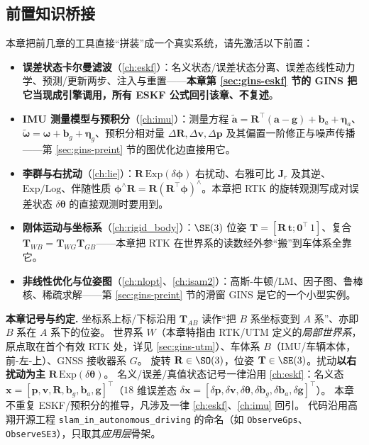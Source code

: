 \subsection*{前置知识桥接}
本章把前几章的工具直接“拼装”成一个真实系统，请先激活以下前置：
\begin{itemize}
  \item \textbf{误差状态卡尔曼滤波}（\cref{ch:eskf}）：名义状态/误差状态分离、误差态线性动力学、预测/更新两步、注入与重置——\textbf{本章第 \ref{sec:gins-eskf} 节的 GINS 把它当现成引擎调用，所有 ESKF 公式回引该章、不复述}。
  \item \textbf{IMU 测量模型与预积分}（\cref{ch:imu}）：测量方程 $\tilde{\mathbf{a}}=\mathbf{R}^\top(\mathbf{a}-\mathbf{g})+\mathbf{b}_a+\boldsymbol{\eta}_a$、$\tilde{\boldsymbol{\omega}}=\boldsymbol{\omega}+\mathbf{b}_g+\boldsymbol{\eta}_g$、预积分相对量 $\Delta\mathbf{R},\Delta\mathbf{v},\Delta\mathbf{p}$ 及其偏置一阶修正与噪声传播——第 \ref{sec:gins-preint} 节的图优化边直接用它。
  \item \textbf{李群与右扰动}（\cref{ch:lie}）：$\mathbf{R}\,\mathrm{Exp}(\delta\boldsymbol{\phi})$ 右扰动、右雅可比 $\mathbf{J}_r$ 及其逆、$\mathrm{Exp}/\mathrm{Log}$、伴随性质 $\boldsymbol{\phi}^\wedge\mathbf{R}=\mathbf{R}(\mathbf{R}^\top\boldsymbol{\phi})^\wedge$。本章把 RTK 的旋转观测写成对误差状态 $\delta\boldsymbol{\theta}$ 的直接观测时要用到。
  \item \textbf{刚体运动与坐标系}（\cref{ch:rigid_body}）：$\SE(3)$ 位姿 $\mathbf{T}=[\mathbf{R}\,\mathbf{t};\mathbf{0}^\top\,1]$、复合 $\mathbf{T}_{WB}=\mathbf{T}_{WG}\mathbf{T}_{GB}$——本章把 RTK 在世界系的读数经外参“搬”到车体系全靠它。
  \item \textbf{非线性优化与位姿图}（\cref{ch:nlopt}、\cref{ch:isam2}）：高斯-牛顿/LM、因子图、鲁棒核、稀疏求解——第 \ref{sec:gins-preint} 节的滑窗 GINS 是它的一个小型实例。
\end{itemize}

\begin{note}
\textbf{本章记号与约定.}\;
坐标系上标/下标沿用 $\mathbf{T}_{AB}$ 读作“把 $B$ 系坐标变到 $A$ 系”、亦即 $B$ 系在 $A$ 系下的位姿。
世界系 $W$（本章特指由 RTK/UTM 定义的\emph{局部世界系}，原点取在首个有效 RTK 处，详见 \cref{sec:gins-utm}）、车体系 $B$（IMU/车辆本体，前-左-上）、GNSS 接收器系 $G$。
旋转 $\mathbf{R}\in\SO(3)$，位姿 $\mathbf{T}\in\SE(3)$。扰动\textbf{以右扰动为主} $\mathbf{R}\,\mathrm{Exp}(\delta\boldsymbol{\theta})$。
名义/误差/真值状态记号一律沿用 \cref{ch:eskf}：名义态 $\mathbf{x}=[\mathbf{p},\mathbf{v},\mathbf{R},\mathbf{b}_g,\mathbf{b}_a,\mathbf{g}]^\top$（$18$ 维误差态 $\delta\mathbf{x}=[\delta\mathbf{p},\delta\mathbf{v},\delta\boldsymbol{\theta},\delta\mathbf{b}_g,\delta\mathbf{b}_a,\delta\mathbf{g}]^\top$）。
本章不重复 ESKF/预积分的推导，凡涉及一律 \cref{ch:eskf}、\cref{ch:imu} 回引。
代码沿用高翔开源工程 \texttt{slam\_in\_autonomous\_driving}\cite{gao2023slamad} 的命名（如 \texttt{ObserveGps}、\texttt{ObserveSE3}），只取其\emph{应用层}骨架。
\end{note}

